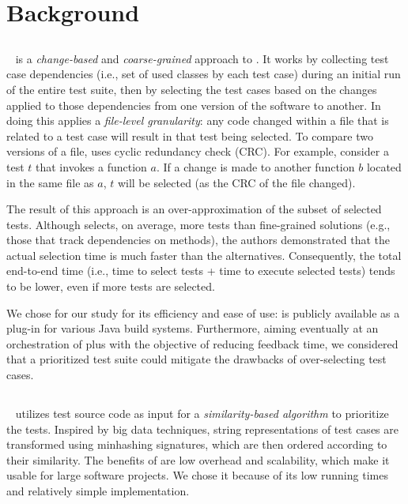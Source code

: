 \section{Background}\label{sec:orch_background}

\subsection{\ek}\label{sec:orch_ekstazi}
\ek~\cite{gligoricEk} is a \textit{change-based} and \textit{coarse-grained} approach to \tcs.
It works by collecting test case dependencies (i.e., set of used classes by each test case) during an initial run of the entire test suite, then by selecting the test cases based on the changes applied to those dependencies from one version of the software to another.
In doing this \ek applies a \textit{file-level granularity}: any code changed within a file that is related to a test case will result in that test being selected.  To compare two versions of a file, \ek uses cyclic redundancy check (CRC).
For example, consider a test $t$ that invokes a function $a$.
If a change is made to another function $b$ located in the same file as $a$,
$t$ will be selected (as the CRC of the file changed).

The result of this approach is an over-approximation of the subset of selected tests.
Although \ek selects, on average, more tests than fine-grained \tcs solutions (e.g., those that track dependencies on methods), the authors demonstrated that the actual selection time is much faster than the alternatives. 
Consequently, the total end-to-end time (i.e., time to select tests + time to execute selected tests) tends to be lower, even if more tests are selected. 

We chose \ek for our study for its efficiency and ease of use: \ek is publicly available as a plug-in for various Java build systems.
Furthermore, aiming eventually at an orchestration of \tcs plus \tcp with the objective of reducing feedback time, we considered that 
a prioritized test suite could mitigate the drawbacks of over-selecting test cases.

\subsection{\fs}\label{sec:orch_fast}

\fs~\cite{miranda_fast_2018} utilizes test source code as input for a \emph{similarity-based algorithm} to prioritize the tests.
Inspired by big data techniques, string representations of test cases are transformed using minhashing signatures, which are then ordered according to their similarity.
The benefits of \fs are low overhead and scalability, which make it usable for large software projects.
We chose it because of its low running times and relatively simple implementation.

